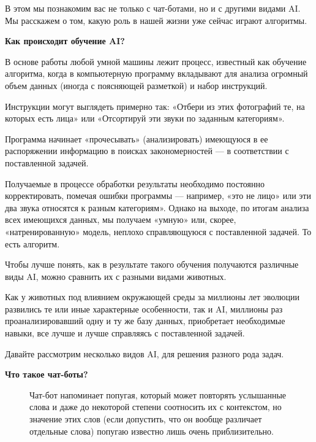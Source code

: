 В этом  мы познакомим вас не только с чат-ботами, но и с другими видами AI. Мы расскажем о том, какую роль в нашей жизни уже сейчас играют алгоритмы.

\textbf{Как происходит обучение AI?}

В основе работы любой умной машины лежит процесс, известный как обучение алгоритма, когда в компьютерную программу вкладывают для анализа огромный объем данных (иногда с поясняющей разметкой) и набор инструкций.

Инструкции могут выглядеть примерно так: «Отбери из этих фотографий те, на которых есть лица» или «Отсортируй эти звуки по заданным категориям».

Программа начинает «прочесывать» (анализировать) имеющуюся в ее распоряжении информацию в поисках закономерностей — в соответствии с поставленной задачей.

Получаемые в процессе обработки результаты необходимо постоянно корректировать, помечая ошибки программы --- например, «это не лицо» или эти два звука относятся к разным категориям». Однако на выходе, по итогам анализа всех имеющихся данных, мы получаем «умную» или, скорее, «натренированную» модель, неплохо справляющуюся с поставленной задачей. То есть алгоритм.

Чтобы лучше понять, как в результате такого обучения получаются различные виды AI, можно сравнить их с разными видами животных.

Как у животных под влиянием окружающей среды за миллионы лет эволюции развились те или иные характерные особенности, так и AI, миллионы раз проанализировавший одну и ту же базу данных, приобретает необходимые навыки, все лучше и лучше справляясь с поставленной задачей.

Давайте рассмотрим несколько видов AI,  для решения разного рода задач.

\textbf{Что такое чат-боты?}

\begin{figure}
    \begin{fancyquotes}
        Чат-бот напоминает попугая, который может повторять услышанные слова и даже до некоторой степени соотносить их с контекстом, но значение этих слов (если допустить, что он вообще различает отдельные слова) попугаю известно лишь очень приблизительно.
    \end{fancyquotes}
\end{figure}

